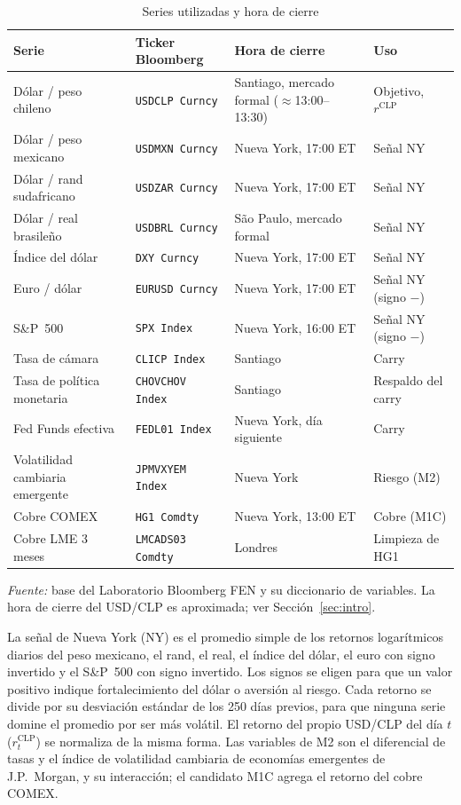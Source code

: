 \documentclass[11pt,a4paper]{article}
\begin{document}
\begin{table}[htbp]\centering\small
\caption{Series utilizadas y hora de cierre}\label{tab:series}
\begin{threeparttable}
\begin{tabularx}{\textwidth}{l l X l}
\toprule
Serie & Ticker Bloomberg & Hora de cierre & Uso \\
\midrule
Dólar / peso chileno & \texttt{USDCLP Curncy} & Santiago, mercado formal ($\approx$13:00--13:30) & Objetivo, $r^{\text{CLP}}$ \\
Dólar / peso mexicano & \texttt{USDMXN Curncy} & Nueva York, 17:00 ET & Señal NY \\
Dólar / rand sudafricano & \texttt{USDZAR Curncy} & Nueva York, 17:00 ET & Señal NY \\
Dólar / real brasileño & \texttt{USDBRL Curncy} & São Paulo, mercado formal & Señal NY \\
Índice del dólar & \texttt{DXY Curncy} & Nueva York, 17:00 ET & Señal NY \\
Euro / dólar & \texttt{EURUSD Curncy} & Nueva York, 17:00 ET & Señal NY (signo $-$) \\
S\&P~500 & \texttt{SPX Index} & Nueva York, 16:00 ET & Señal NY (signo $-$) \\
Tasa de cámara & \texttt{CLICP Index} & Santiago & Carry \\
Tasa de política monetaria & \texttt{CHOVCHOV Index} & Santiago & Respaldo del carry \\
Fed Funds efectiva & \texttt{FEDL01 Index} & Nueva York, día siguiente & Carry \\
Volatilidad cambiaria emergente & \texttt{JPMVXYEM Index} & Nueva York & Riesgo (M2) \\
Cobre COMEX & \texttt{HG1 Comdty} & Nueva York, 13:00 ET & Cobre (M1C) \\
Cobre LME 3 meses & \texttt{LMCADS03 Comdty} & Londres & Limpieza de HG1 \\
\bottomrule
\end{tabularx}
\begin{tablenotes}\footnotesize
\item \emph{Fuente:} base del Laboratorio Bloomberg FEN y su diccionario de variables. La hora de cierre del USD/CLP es aproximada; ver Sección~\ref{sec:intro}.
\end{tablenotes}
\end{threeparttable}
\end{table}

La señal de Nueva York (NY) es el promedio simple de los retornos logarítmicos diarios del peso mexicano, el rand, el real, el índice del dólar, el euro con signo invertido y el S\&P~500 con signo invertido. Los signos se eligen para que un valor positivo indique fortalecimiento del dólar o aversión al riesgo. Cada retorno se divide por su desviación estándar de los 250 días previos, para que ninguna serie domine el promedio por ser más volátil. El retorno del propio USD/CLP del día $t$ ($r^{\text{CLP}}_t$) se normaliza de la misma forma. Las variables de M2 son el diferencial de tasas y el índice de volatilidad cambiaria de economías emergentes de J.P.~Morgan, y su interacción; el candidato M1C agrega el retorno del cobre COMEX.
\end{document}
